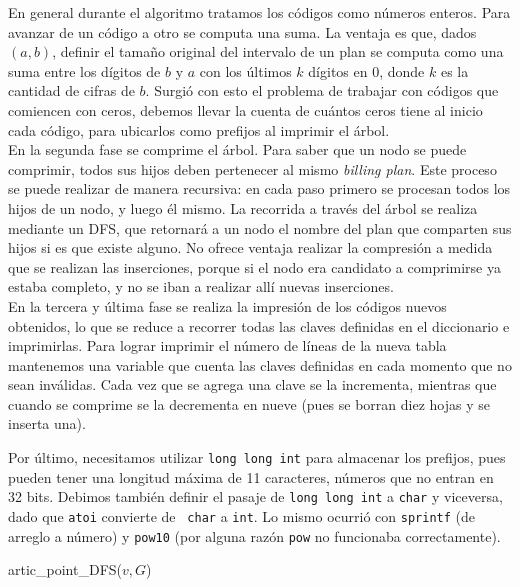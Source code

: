 En general durante el algoritmo tratamos los códigos como números
enteros. Para avanzar de un código a otro se computa una suma. La ventaja es
que, dados $(a,b)$, definir el tamaño original del intervalo de un plan se
computa como una suma entre los dígitos de $b$ y $a$ con los últimos $k$
dígitos en 0, donde $k$ es la cantidad de cifras de $b$. Surgió con esto
el problema de trabajar con códigos que comiencen con ceros, debemos llevar
la cuenta de cuántos ceros tiene al inicio cada código, para ubicarlos
como prefijos al imprimir el árbol.\\

En la segunda fase se comprime el árbol. Para saber que un nodo se puede
comprimir, todos sus hijos deben pertenecer al mismo {\sl billing plan}. Este
proceso se puede realizar de manera recursiva: en cada paso primero se
procesan todos los hijos de un nodo, y luego él mismo. La recorrida a
través del árbol se realiza mediante un DFS, que retornará a un nodo el
nombre del plan que comparten sus hijos si es que existe alguno. No ofrece
ventaja realizar la compresión a medida que se realizan las inserciones,
porque si el nodo era candidato a comprimirse ya estaba completo, y no se
iban a realizar allí nuevas inserciones.\\

En la tercera y última fase se realiza la impresión de los códigos nuevos
obtenidos, lo que se reduce a recorrer todas las claves definidas en el
diccionario e imprimirlas. Para lograr imprimir el número de líneas de
la nueva tabla mantenemos una variable que cuenta las claves definidas en
cada momento que no sean inválidas. Cada vez que se agrega una clave se
la incrementa, mientras que cuando se comprime se la decrementa en nueve
(pues se borran diez hojas y se inserta una).

Por último, necesitamos utilizar {\tt long long int} para almacenar los
prefijos, pues pueden tener una longitud máxima de 11 caracteres, números
que no entran en 32 bits. Debimos también definir el pasaje de {\tt long
long int} a {\tt char} y viceversa, dado que {\tt atoi} convierte de {\tt
char} a {\tt int}. Lo mismo ocurrió con {\tt sprintf} (de arreglo a número)
y {\tt pow10} (por alguna razón {\tt pow} no funcionaba correctamente).

\begin{algorithm}[H]
\linesnumbered
\caption{artic\_point\_DFS($v,G$)}

\vspace{0.4cm}
\end{algorithm}

